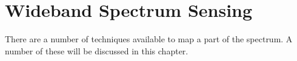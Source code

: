 \chapter{Wideband Spectrum Sensing}
There are a number of techniques available to map a part of the spectrum. A number of these will be discussed in this chapter.



